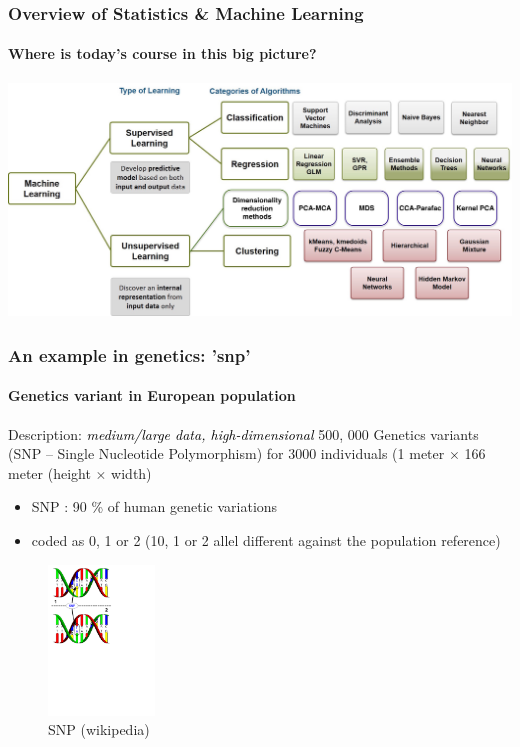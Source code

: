 \documentclass{beamer}\usepackage[]{graphicx}\usepackage[]{color}
\begin{document}
\begin{frame}
	\frametitle{Overview of Statistics \& Machine Learning}
	\framesubtitle{Where is today's course in this big picture?}

	\begin{center}
		\includegraphics[width=\textwidth]{figures/Learning+Types.jpg}
	\end{center}

\end{frame}

\begin{frame}[fragile]
  \frametitle{An example in genetics: 'snp'}
  \framesubtitle{Genetics variant in European population}

\begin{block}{Description: \textcolor{black}{\it medium/large data, high-dimensional}}
500, 000 Genetics variants (SNP -- Single Nucleotide Polymorphism) for  3000 individuals
(1 meter $\times$ 166 meter (height $\times$ width)
\end{block}

\begin{multicols}{2}
  \begin{itemize}
  \item SNP : 90 \% of human genetic variations
  \item coded as 0, 1 or 2 (10, 1 or 2 allel different against the population reference)
  \end{itemize}

  \begin{figure}
    \centering
     \includegraphics[height=4cm]{SNP}   
    \caption{SNP (wikipedia)}
  \end{figure}
\end{multicols}

\end{frame}
\end{document}
